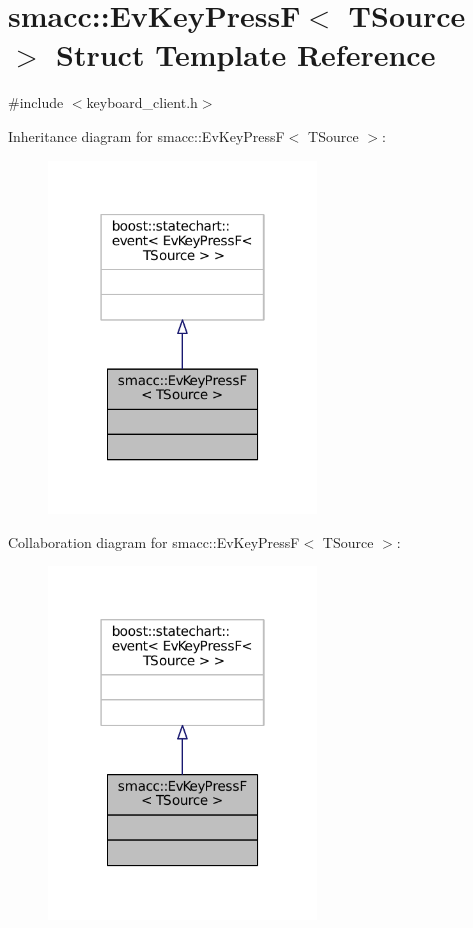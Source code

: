 \hypertarget{structsmacc_1_1EvKeyPressF}{}\section{smacc\+:\+:Ev\+Key\+PressF$<$ T\+Source $>$ Struct Template Reference}
\label{structsmacc_1_1EvKeyPressF}


{\ttfamily \#include $<$keyboard\+\_\+client.\+h$>$}



Inheritance diagram for smacc\+:\+:Ev\+Key\+PressF$<$ T\+Source $>$\+:
\nopagebreak
\begin{figure}[H]
\begin{center}
\leavevmode
\includegraphics[width=202pt]{structsmacc_1_1EvKeyPressF__inherit__graph}
\end{center}
\end{figure}


Collaboration diagram for smacc\+:\+:Ev\+Key\+PressF$<$ T\+Source $>$\+:
\nopagebreak
\begin{figure}[H]
\begin{center}
\leavevmode
\includegraphics[width=202pt]{structsmacc_1_1EvKeyPressF__coll__graph}
\end{center}
\end{figure}


